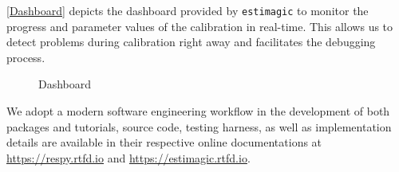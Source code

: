 \autoref{Dashboard} depicts the dashboard provided by \verb+estimagic+ to monitor the progress and parameter values of the calibration in real-time. This allows us to detect problems during calibration right away and facilitates the debugging process.

\begin{figure}[b!]\centering
\caption{Dashboard}\label{Dashboard}
\end{figure}%

We adopt a modern software engineering workflow in the development of both packages and tutorials, source code, testing harness, as well as implementation details are available in their respective online documentations at \url{https://respy.rtfd.io} and \url{https://estimagic.rtfd.io}.
